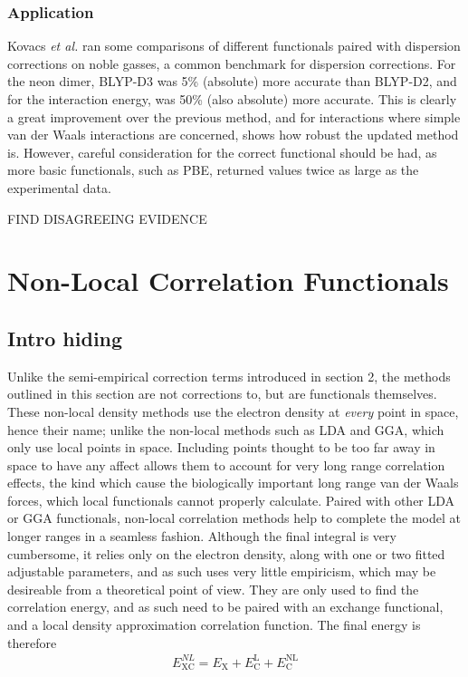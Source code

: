 \documentclass[10pt,a4paper,twocolumn,twoside]{extarticle}
\newcommand{\al}{\emph{et al. }}
\begin{document}
	\subsubsection{Application}
	 Kovacs \al ran some comparisons of different functionals paired with dispersion corrections on noble gasses, a common benchmark for dispersion corrections. For the neon dimer, BLYP-D3 was 5\% (absolute) more accurate than BLYP-D2, and for the interaction energy, was 50\% (also absolute) more accurate.\cite{Kovacs2017} 
	 This is clearly a great improvement over the previous method, and for interactions where simple van der Waals interactions are concerned, shows how robust the updated method is. However, careful consideration for the correct functional should be had, as more basic functionals, such as PBE, returned values twice as large as the experimental data.\cite{Kovacs2017}

	 FIND DISAGREEING EVIDENCE 



	\section{Non-Local Correlation Functionals}
	\subsection{Intro hiding}
	Unlike the semi-empirical correction terms introduced in section 2, the methods outlined in this section are not corrections to, but are functionals themselves. These non-local density methods use the electron density at \emph{every} point in space, hence their name; unlike the non-local methods such as LDA and GGA, which only use local points in space. Including points thought to be too far away in space to have any affect allows them to account for very long range correlation effects, the kind which cause the biologically important long range van der Waals forces, which local functionals cannot properly calculate. Paired with other LDA or GGA functionals, non-local correlation methods help to complete the model at longer ranges in a seamless fashion. Although the final integral is very cumbersome, it relies only on the electron density, along with one or two fitted adjustable parameters, and as such uses very little empiricism, which may be desireable from a theoretical point of view. They are only used to find the correlation energy, and as such need to be paired with an exchange functional, and a local density approximation correlation function. The final energy is therefore
	\begin{align}
		E_\text{XC}^{NL} = E_\text{X} + E_\text{C}^\text{L} + E_\text{C}^\text{NL}
	\end{align} 
\end{document}
